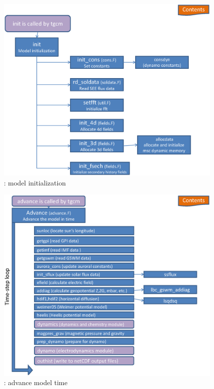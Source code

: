 %
%
\begin{figure}
  \centering
  \includegraphics[scale=0.7,angle=-90.]{./tex_plot/code_3.ps}
  \caption{: model initialization}
   \label{fig:code_3}
\end{figure}
%
\begin{figure}
  \centering
  \includegraphics[scale=0.7,angle=-90.]{./tex_plot/code_4.ps}
  \caption{: advance model time}
   \label{fig:code_4}
\end{figure}
